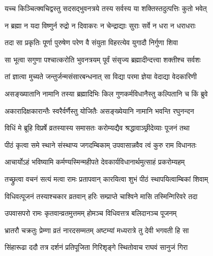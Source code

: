 \twolineshloka
{यच्च किञ्चित्क्वचिद्वस्तु सदसद्‌भुवनत्रये}
{तस्य सर्वस्य या शक्तिस्तदुत्पत्तिः कुतो भवेत्}%

\twolineshloka
{न ब्रह्मा न यदा विष्णुर्न रुद्रो न दिवाकरः}
{न चेन्द्राद्याः सुराः सर्वे न धरा न धराधराः}%

\twolineshloka
{तदा सा प्रकृतिः पूर्णा पुरुषेण परेण वै}
{संयुता विहरत्येव युगादौ निर्गुणा शिवा}%

\twolineshloka
{सा भूत्वा सगुणा पश्चात्करोति भुवनत्रयम्}
{पूर्वं संसृज्य ब्रह्मादीन्दत्त्वा शक्तीश्च सर्वशः}%

\twolineshloka
{तां ज्ञात्वा मुच्यते जन्तुर्जन्मसंसारबन्धनात्}
{सा विद्या परमा ज्ञेया वेदाद्या वेदकारिणी}%

\twolineshloka
{असङ्ख्यातानि नामानि तस्या ब्रह्मादिभिः किल}
{गुणकर्मविधानैस्तु कल्पितानि च किं ब्रुवे}%

\twolineshloka
{अकारादिक्षकारान्तैः स्वरैर्वर्णैस्तु योजितैः}
{असङ्ख्येयानि नामानि भवन्ति रघुनन्दन}%




\twolineshloka
{विधिं मे ब्रूहि विप्रर्षे व्रतस्यास्य समासतः}
{करोम्यद्यैव श्रद्धावाञ्छ्रीदेव्याः पूजनं तथा}%



\twolineshloka
{पीठं कृत्वा समे स्थाने संस्थाप्य जगदम्बिकाम्}
{उपवासान्नवैव त्वं कुरु राम विधानतः}%

\twolineshloka
{आचार्योऽहं भविष्यामि कर्मण्यस्मिन्महीपते}
{देवकार्यविधानार्थमुत्साहं प्रकरोम्यहम्}%



\twolineshloka
{तच्छ्रुत्वा वचनं सत्यं मत्वा रामः प्रतापवान्}
{कारयित्वा शुभं पीठं स्थापयित्वाम्बिकां शिवाम्}%

\twolineshloka
{विधिवत्पूजनं तस्याश्चकार व्रतवान् हरिः}
{सम्प्राप्ते चाश्विने मासि तस्मिन्गिरिवरे तदा}%

\twolineshloka
{उपवासपरो रामः कृतवान्व्रतमुत्तमम्}
{होमञ्च विधिवत्तत्र बलिदानञ्च पूजनम्}%

\twolineshloka
{भ्रातरौ चक्रतुः प्रेम्णा व्रतं नारदसम्मतम्}
{अष्टम्यां मध्यरात्रे तु देवी भगवती हि सा}%

\twolineshloka
{सिंहारूढा ददौ तत्र दर्शनं प्रतिपूजिता}
{गिरिशृङ्गे स्थितोवाच राघवं सानुजं गिरा}%




